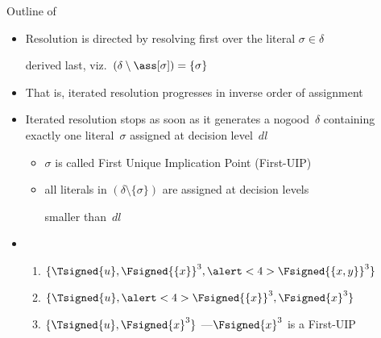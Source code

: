 \begin{frame}{Outline of \ConflictAnalysis}
  \begin{itemize}
  \item<2-> Resolution is directed by resolving first over the literal $\sigma\in\delta$
    \par
    derived last, viz.\ $(\delta\setminus\ass[\sigma])=\{\sigma\}$
  \item <2->[]
    That is, iterated resolution progresses in inverse order of assignment
    \smallskip
  \item<5-> Iterated resolution stops as soon as it generates
    a nogood~$\delta$ containing exactly one literal~$\sigma$ assigned
    at decision level~$\mathit{dl}$
    \begin{itemize}\normalsize
    \item $\sigma$ is called \alert{First Unique Implication Point} (First-UIP)
    \item all literals in $(\delta\setminus\{\sigma\})$ are assigned
      at decision levels\par smaller than~$\mathit{dl}$
    \end{itemize}
    \smallskip
  \item<3->  \
    \begin{enumerate}\normalsize
    \item $\{\Tsigned{u},\Fsigned{\{x\}}^3,\alert<4>{\Fsigned{\{x,y\}}}^3\}$
      \smallskip
    \item $\{\Tsigned{u},\alert<4>{\Fsigned{\{x\}}}^3,\Fsigned{x}^3\}$
      \smallskip
    \item $\{\Tsigned{u},\Fsigned{x}^3\}$ \quad\pause[6] ---\quad  $\Fsigned{x}^3$ is a First-UIP
    \end{enumerate}
  \end{itemize}
\end{frame}
\begin{frame}[c]

\end{frame}
